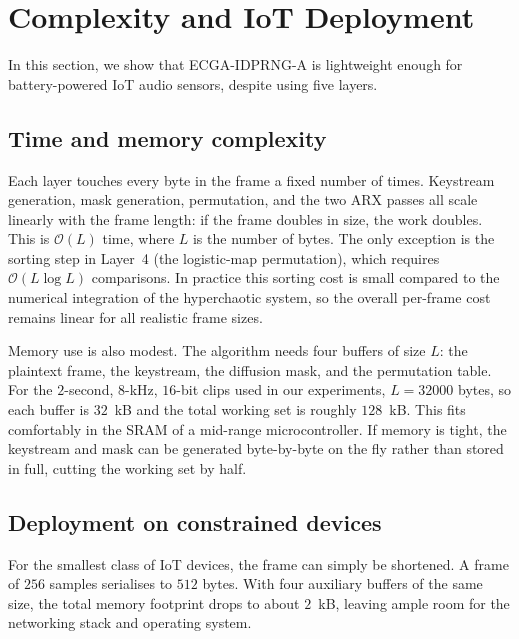 \documentclass[pdflatex,sn-mathphys-num]{sn-jnl}%
\theoremstyle{thmstyleone}%
\theoremstyle{thmstyletwo}%
\theoremstyle{thmstylethree}%
\begin{document}
\section{Complexity and IoT Deployment}
\label{sec:complexity}

In this section, we show that ECGA-IDPRNG-A is lightweight enough for battery-powered IoT audio sensors, despite using five layers.

\subsection{Time and memory complexity}

Each layer touches every byte in the frame a fixed number of times. Keystream generation, mask generation, permutation, and the two ARX passes all scale linearly with the frame length: if the frame doubles in size, the work doubles. This is $\mathcal{O}(L)$ time, where $L$ is the number of bytes. The only exception is the sorting step in Layer~4 (the logistic-map permutation), which requires $\mathcal{O}(L\log L)$ comparisons. In practice this sorting cost is small compared to the numerical integration of the hyperchaotic system, so the overall per-frame cost remains linear for all realistic frame sizes.

Memory use is also modest. The algorithm needs four buffers of size $L$: the plaintext frame, the keystream, the diffusion mask, and the permutation table. For the $2$-second, $8$-kHz, $16$-bit clips used in our experiments, $L=32000$ bytes, so each buffer is $32$~kB and the total working set is roughly $128$~kB. This fits comfortably in the SRAM of a mid-range microcontroller. If memory is tight, the keystream and mask can be generated byte-by-byte on the fly rather than stored in full, cutting the working set by half.

\subsection{Deployment on constrained devices}

For the smallest class of IoT devices, the frame can simply be shortened. A frame of $256$ samples serialises to $512$ bytes. With four auxiliary buffers of the same size, the total memory footprint drops to about $2$~kB, leaving ample room for the networking stack and operating system.
\end{document}
